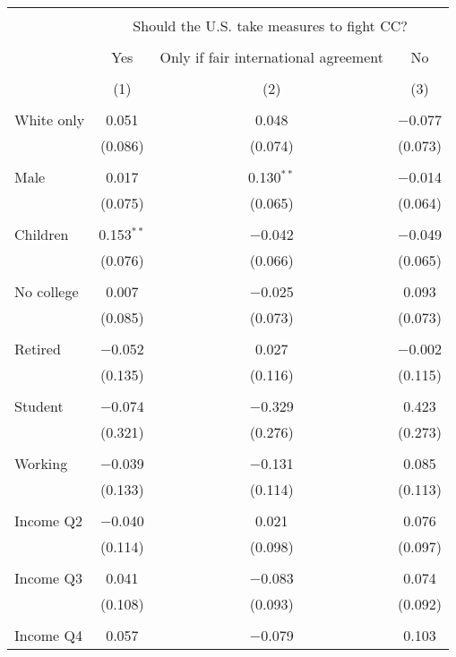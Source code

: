 
\begin{tabular}{@{\extracolsep{5pt}}lccc} 
\\[-1.8ex]\hline 
\hline \\[-1.8ex] 
 & \multicolumn{3}{c}{Should the U.S. take measures to fight CC?} \\ 
\cline{2-4} 
\\[-1.8ex] & Yes & Only if fair international agreement & No \\ 
\\[-1.8ex] & (1) & (2) & (3)\\ 
\hline \\[-1.8ex] 
 White only & 0.051 & 0.048 & $-$0.077 \\ 
  & (0.086) & (0.074) & (0.073) \\ 
  & & & \\ 
 Male & 0.017 & 0.130$^{**}$ & $-$0.014 \\ 
  & (0.075) & (0.065) & (0.064) \\ 
  & & & \\ 
 Children & 0.153$^{**}$ & $-$0.042 & $-$0.049 \\ 
  & (0.076) & (0.066) & (0.065) \\ 
  & & & \\ 
 No college & 0.007 & $-$0.025 & 0.093 \\ 
  & (0.085) & (0.073) & (0.073) \\ 
  & & & \\ 
 Retired & $-$0.052 & 0.027 & $-$0.002 \\ 
  & (0.135) & (0.116) & (0.115) \\ 
  & & & \\ 
 Student & $-$0.074 & $-$0.329 & 0.423 \\ 
  & (0.321) & (0.276) & (0.273) \\ 
  & & & \\ 
 Working & $-$0.039 & $-$0.131 & 0.085 \\ 
  & (0.133) & (0.114) & (0.113) \\ 
  & & & \\ 
 Income Q2 & $-$0.040 & 0.021 & 0.076 \\ 
  & (0.114) & (0.098) & (0.097) \\ 
  & & & \\ 
 Income Q3 & 0.041 & $-$0.083 & 0.074 \\ 
  & (0.108) & (0.093) & (0.092) \\ 
  & & & \\ 
 Income Q4 & 0.057 & $-$0.079 & 0.103 \\ 

\end{tabular}
